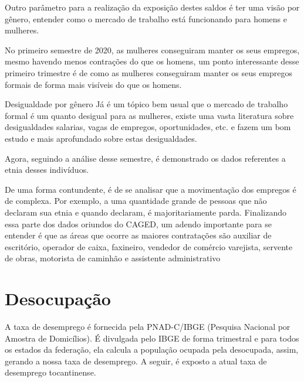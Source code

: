 \par Outro parâmetro para a realização da exposição destes saldos é ter uma visão por gênero, entender como o mercado de trabalho está funcionando para homens e mulheres. 


\par No primeiro semestre de 2020, as mulheres conseguiram manter os seus empregos, mesmo havendo menos contrações do que os homens, um ponto interessante desse primeiro trimestre é de como as mulheres conseguiram manter os seus empregos formais de forma mais visíveis do que os homens.


\begin{smbox}[label={labelbox},nameref={Desigualdade por gênero}]{Desigualdade por gênero}
	Já é um tópico bem usual que o mercado de trabalho formal é um quanto desigual para as mulheres, existe uma vasta literatura sobre desigualdades salarias, vagas de empregos, oportunidades, etc. \cite{bibCotrim2020desigualdade} e \cite{bibHaussmann2018desigualdades} fazem um bom estudo e mais aprofundado sobre estas desigualdades.
\end{smbox}


\par Agora, seguindo a análise desse semestre, é demonstrado os dados referentes a etnia desses indivíduos.


\par De uma forma contundente, é de se analisar que a movimentação dos empregos é de complexa. Por exemplo, a uma quantidade grande de pessoas que não declaram sua etnia e quando declaram, é majoritariamente parda. Finalizando essa parte dos dados oriundos do CAGED, um adendo importante para se entender é que as áreas que ocorre as maiores contratações são auxiliar de escritório, operador de caixa, faxineiro, vendedor de comércio varejista, servente de obras, motorista de caminhão e assistente administrativo


\section{Desocupação}

\par A taxa de desemprego é fornecida pela PNAD-C/IBGE (Pesquisa Nacional por Amostra de Domicílios). É divulgada pelo IBGE de forma trimestral e para todos os estados da federação, ela calcula a população ocupada pela desocupada, assim, gerando a nossa taxa de desemprego. A seguir, é exposto a atual taxa de desemprego tocantinense.

